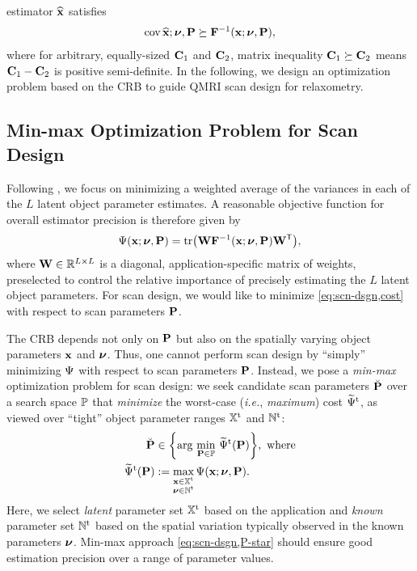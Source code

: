 estimator $\widehat{\mathbf{x}}$ satisfies
\begin{align}
	\cov{\est{\bmx}; \bmnu, \bmP} \succeq
		\bmF^{-1}\paren{\bmx; \bmnu, \bmP},
		\label{eq:scn-dsgn,crb}
\end{align}
where for arbitrary, equally-sized $\mathbf{C}_{1}$ and $\mathbf{C}_{2}$,
matrix inequality $\mathbf{C}_{1} \succeq \mathbf{C}_{2}$ 
means $\mathbf{C}_{1}-\mathbf{C}_{2}$ is positive semi-definite.
In the following,
we design an optimization problem 
based on the CRB
to guide QMRI scan design 
for relaxometry.

\subsection{Min-max Optimization Problem for Scan Design}
\label{ss,scn-dsgn,crb,minmax}

Following \cite{chernoff:53:lod}, 
we focus on minimizing a weighted average 
of the variances 
in each of the $L$ latent object parameter estimates. 
A reasonable objective function 
for overall estimator precision 
is therefore given by
\begin{align}
	\costa{\bmx; \bmnu, \bmP} =
		\trace{\bmW \bmF^{-1}\paren{\bmx; \bmnu, \bmP} \bmW\tpose}, 
		\label{eq:scn-dsgn,cost}
\end{align}
where $\mathbf{W} \in \mathbb{R}^{L \times L}$ 
is a diagonal, application-specific  matrix of weights, 
preselected to control the relative importance 
of precisely estimating the $L$ latent object parameters. 
For scan design, 
we would like to minimize \eqref{eq:scn-dsgn,cost} 
with respect to scan parameters $\mathbf{P}$.
 
The CRB depends not only on $\mathbf{P}$ 
but also on the spatially varying object parameters 
$\mathbf{x}$ and $\boldsymbol{\nu}$. 
Thus, one cannot perform scan design 
by ``simply'' minimizing $\Psi$ 
with respect to scan parameters $\mathbf{P}$. 
Instead, we pose a 
\emph{min-max} optimization problem 
for scan design: 
we seek candidate scan parameters $\breve{\mathbf{P}}$ 
over a search space $\mathbb{P}$ 
that \emph{minimize} the worst-case 
(\emph{i.e.}, \emph{maximum}) 
cost $\widetilde{\Psi}^{\mathrm{t}}$, 
as viewed over ``tight'' object parameter ranges 
$\mathbb{X}^\mathrm{t}$ and $\mathbb{N}^\mathrm{t}$:
\begin{align}
	\breve{\bmP} &\in 
		\set{\argmin{\bmP \in \setP} \costawt{\bmP}}, \where 
		\label{eq:scn-dsgn,P-cand} \\
	\costawt{\bmP} &:=
		\max_{\substack{\bmx \in \setXt \\ \bmnu \in \setNt}}
		\costa{\bmx; \bmnu, \bmP}.
		\label{eq:scn-dsgn,cost-tight}
\end{align}
Here, 
we select \emph{latent} parameter set $\mathbb{X}^\mathrm{t}$ 
based on the application 
and \emph{known} parameter set $\mathbb{N}^\mathrm{t}$ 
based on the spatial variation typically observed 
in the known parameters $\boldsymbol{\nu}$. 
Min-max approach \eqref{eq:scn-dsgn,P-star} 
should ensure good estimation precision 
over a range of parameter values.

